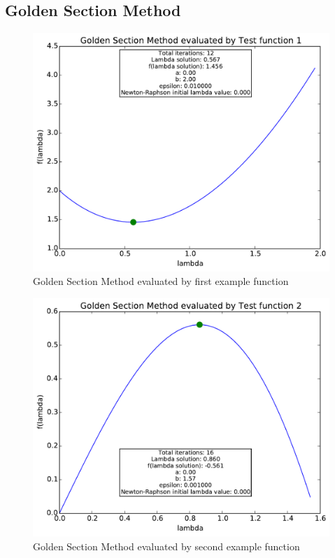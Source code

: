 \documentclass[a4paper,10pt]{article}
\begin{document}
\subsection{Golden Section Method}
\begin{figure}[h]
\centering
 \includegraphics[scale=0.55]{./graphs/algorithm3/testFunction1.pdf} 
 \caption{Golden Section Method evaluated by first example function}
 \label{fig:alg3test1}
\end{figure}

\begin{figure}[h]
\centering
 \includegraphics[scale=0.55]{./graphs/algorithm3/testFunction2.pdf} 
 \caption{Golden Section Method evaluated by second example function}
 \label{fig:alg3test2}
\end{figure}
\end{document}
